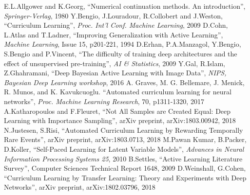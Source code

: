 \documentclass[a4paper,11pt]{article}
\begin{document}
\begin{thebibliography}{1}
E.L.Allgower and K.Georg, ``Numerical continuation methods. An introduction'', \textit{Springer-Verlag}, 1980
Y.Bengio, J.Louradour, R.Collobert and J.Weston, ``Curriculum Learning'', \textit{Proc. Int'l Conf. Machine Learning}, 2009
D.Cohn, L.Atlas and T.Ladner, ``Improving Generalization with Active Learning'', \textit{Machine Learning}, Issue 15, p201-221, 1994
D.Erhan, P.A.Manzagol, Y.Bengio, S.Bengio and P.Vincent, ``The difficulty of training deep architectures and the effect of unsupervised pre-training'', \textit{AI \& Statistics}, 2009
Y.Gal, R.Islam, Z.Ghahramani, ``Deep Bayesian Active Learning with Image Data'', \textit{NIPS, Bayesian Deep Learning workshop}, 2016
A. Graves, M. G. Bellemare, J. Menick, R. Munos, and K. Kavukcuoglu. ``Automated curriculum learning for neural networks'', \textit{Proc. Machine Learning Research}, 70, p1311-1320, 2017
A.Katharopoulos and F.Fleuret, ``Not All Samples are Created Equal: Deep Learning with Importance Sampling'', arXiv preprint, arXiv:1803.00942, 2018
N.Justesen, S.Risi, ``Automated Curriculum Learning by Rewarding Temporally Rare Events'', arXiv preprint, arXiv:1803.0713, 2018
M.Pawan Kumar, B.Packer, D.Koller, ``Self-Paced Learning for Latent Variable Models'', \textit{Advances in Neural Information Processing Systems 25}, 2010
B.Settles, ``Active Learning Literature Survey'', Computer Sciences Technical Report 1648, 2009
D.Weinshall, G.Cohen, ``Curriculum Learning by Transfer Learning: Theory and Experiments with Deep Networks'', arXiv preprint, arXiv:1802.03796, 2018


\end{thebibliography}
\end{document}
